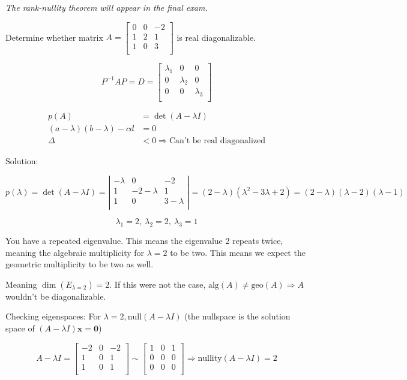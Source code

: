 \documentclass[
]{article}
\begin{document}
\emph{The rank-nullity theorem will appear in the final exam.}

Determine whether matrix $A = \begin{bmatrix}
0 & 0 & - 2 \\
1 & 2 & 1 \\
1 & 0 & 3 \\
\end{bmatrix}$ is real diagonalizable.

$$P^{- 1}AP = D = \begin{bmatrix}
\lambda_{1} & 0 & 0 \\
0 & \lambda_{2} & 0 \\
0 & 0 & \lambda_{3} \\
\end{bmatrix}$$

\begin{align*}
p(A) &= \det(A - \lambda I)
 \\
(a - \lambda)(b - \lambda) - cd &= 0
 \\
\Delta &< 0 \Rightarrow \text{Can't\ be\ real\ diagonalized}
\end{align*}


Solution:

$$p(\lambda) = \det(A - \lambda I) = \left| \begin{matrix}
 - \lambda & 0 & - 2 \\
1 & - 2 - \lambda & 1 \\
1 & 0 & 3 - \lambda \\
\end{matrix} \right| = (2 - \lambda)\left( \lambda^{2} - 3\lambda + 2 \right) = (2 - \lambda)(\lambda - 2)(\lambda - 1)$$

$$\lambda_{1} = 2,\ \lambda_{2} = 2,\ \lambda_{3} = 1$$

You have a repeated eigenvalue. This means the eigenvalue 2 repeats
twice, meaning the algebraic multiplicity for $\lambda = 2$ to be two.
This means we expect the geometric multiplicity to be two as well.

Meaning $\dim\left( E_{\lambda = 2} \right) = 2$. If this were not the
case, $\text{alg}(A) \neq \text{geo}(A) \Rightarrow A$ wouldn't be
diagonalizable.

Checking eigenspaces: For $\lambda = 2,\text{null}(A - \lambda I)$
(the nullspace is the solution space of
$(A - \lambda I)\mathbf{x} = \mathbf{0}$)

$$A - \lambda I = \begin{bmatrix}
 - 2 & 0 & - 2 \\
1 & 0 & 1 \\
1 & 0 & 1 \\
\end{bmatrix}\sim\begin{bmatrix}
1 & 0 & 1 \\
0 & 0 & 0 \\
0 & 0 & 0 \\
\end{bmatrix} \Rightarrow \text{nullity}(A - \lambda I) = 2$$
\end{document}
